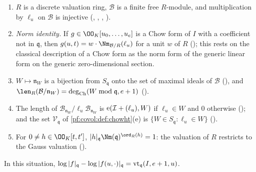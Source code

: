 \begin{enumerate}[label=(\arabic*)]
\item $R$ is a discrete valuation ring, $\mathcal B$ is a finite free $R$-module, and multiplication by
  $\ell_u$ on $\mathcal B$ is injective
  (,
  ,
  ,
  ).
\item \emph{Norm identity.} If $g\in\OO_K[u_0,\dots,u_e]$ is a Chow form of $I$ with a coefficient not in
  $\mathfrak q$, then $g(u,t)=w\cdot\Nm_{\mathcal B/R}(\ell_u)$ for a unit $w$ of $R$
  (); this rests on the classical
  description of a Chow form as the norm form of the generic linear form on the generic zero-dimensional
  section.
\item $W\mapsto\mathfrak n_W$ is a bijection from $S_{\mathfrak q}$ onto the set of maximal ideals of
  $\mathcal B$ (), and
  $\len_R(\mathcal B/\mathfrak n_W)=\covolCdeg(W\bmod\mathfrak q,e+1)$
  ().
\item The length of $\mathcal B_{\mathfrak n_W}/\ell_u\mathcal B_{\mathfrak n_W}$ is
  $\operatorname{e}(\mathcal I+(\ell_u),W)$ if $\ell_u\in W$ and $0$ otherwise
  (); and the set
  $\mathcal V_{\mathfrak q}$ of \cref{pf:covol:def:chowht}(e) is $\{W\in S_{\mathfrak q}:\ell_u\in W\}$
  ().
\item For $0\ne h\in\OO_K[t,t']$, $|h|_{\mathfrak q}\Nm(\mathfrak q)^{\ord_R(h)}=1$: the valuation of $R$
  restricts to the Gauss valuation ().
\end{enumerate}

\begin{proposition}\label{pf:covol:prop:csv}
In this situation,
$\log|f|_{\mathfrak q}-\log|f(u,\cdot)|_{\mathfrak q}=\operatorname{vt}_{\mathfrak q}(I,e+1,u)$.
\end{proposition}

